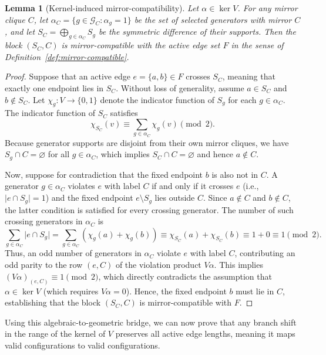 \documentclass[11pt]{article}
\theoremstyle{plain}
\newtheorem{lemma}{Lemma}
\theoremstyle{definition}
\begin{document}
\begin{lemma}[Kernel-induced mirror-compatibility]
\label{lem:kernel-compatibility}
Let $\alpha \in \ker V$. For any mirror clique $C$, let $\alpha_C = \{g \in \mathcal{G}_C : \alpha_g = 1\}$ be the set of selected generators with mirror $C$, and let $S_C = \bigoplus_{g \in \alpha_C} S_g$ be the symmetric difference of their supports. Then the block $(S_C, C)$ is mirror-compatible with the active edge set $F$ in the sense of Definition~\ref{def:mirror-compatible}.
\end{lemma}

\begin{proof}
Suppose that an active edge $e = \{a,b\} \in F$ crosses $S_C$, meaning that exactly one endpoint lies in $S_C$. Without loss of generality, assume $a \in S_C$ and $b \notin S_C$. Let $\chi_g: V \to \{0,1\}$ denote the indicator function of $S_g$ for each $g \in \alpha_C$. The indicator function of $S_C$ satisfies
\[
\chi_{S_C}(v) \equiv \sum_{g \in \alpha_C} \chi_g(v) \pmod 2.
\]
Because generator supports are disjoint from their own mirror cliques, we have $S_g \cap C = \varnothing$ for all $g \in \alpha_C$, which implies $S_C \cap C = \varnothing$ and hence $a \notin C$.

Now, suppose for contradiction that the fixed endpoint $b$ is also not in $C$. A generator $g \in \alpha_C$ violates $e$ with label $C$ if and only if it crosses $e$ (i.e., $\lvert e \cap S_g \rvert = 1$) and the fixed endpoint $e \setminus S_g$ lies outside $C$. Since $a \notin C$ and $b \notin C$, the latter condition is satisfied for every crossing generator. The number of such crossing generators in $\alpha_C$ is
\[
\sum_{g \in \alpha_C} \lvert e \cap S_g \rvert
=
\sum_{g \in \alpha_C} (\chi_g(a) + \chi_g(b))
\equiv
\chi_{S_C}(a) + \chi_{S_C}(b)
\equiv
1 + 0
\equiv
1 \pmod 2.
\]
Thus, an odd number of generators in $\alpha_C$ violate $e$ with label $C$, contributing an odd parity to the row $(e,C)$ of the violation product $V\alpha$. This implies $(V\alpha)_{(e,C)} \equiv 1 \pmod 2$, which directly contradicts the assumption that $\alpha \in \ker V$ (which requires $V\alpha = 0$). Hence, the fixed endpoint $b$ must lie in $C$, establishing that the block $(S_C, C)$ is mirror-compatible with $F$.
\end{proof}

Using this algebraic-to-geometric bridge, we can now prove that any branch shift in the range of the kernel of $V$ preserves all active edge lengths, meaning it maps valid configurations to valid configurations.
\end{document}
